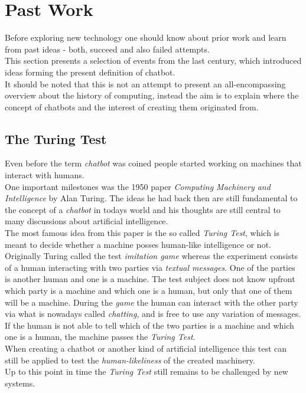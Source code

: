 \section{Past Work}


Before exploring new technology one should know about prior work and learn from past ideas - both, succeed and also failed attempts.
\\
This section presents a selection of events from the last century, which introduced ideas forming the present definition of chatbot.
\\
It should be noted that this is not an attempt to present an all-encompassing overview about the history of computing,
instead the aim is to explain where the concept of chatbots and the interest of creating them originated from.


\subsection{The Turing Test}

Even before the term \emph{chatbot} was coined people started working on machines that interact with humans.
\\
One important milestones was the 1950 paper \emph{Computing Machinery and Intelligence} by Alan Turing\cite{turing}.
The ideas he had back then are still fundamental to the concept of a \emph{chatbot} in todays world
and his thoughts are still central to many discussions about artificial intelligence.
\\
The most famous idea from this paper is the so called \emph{Turing Test},
which is meant to decide whether a machine posses human-like intelligence or not.
\\
Originally Turing called the test \emph{imitation game} whereas the experiment consists of a human interacting with two parties via \emph{textual messages}.
One of the parties is another human and one is a machine.
The test subject does not know upfront which party is a machine and which one is a human, but only that one of them will be a machine.
During the \emph{game} the human can interact with the other party
via what is nowadays called \emph{chatting},
and is free to use any variation of messages.
\\
If the human is not able to tell which of the two parties is a machine and which one is a human, the machine passes the \emph{Turing Test}.
\\

When creating a chatbot or another kind of artificial intelligence this test can still be applied to test the \emph{human-likeliness} of the created machinery.
\\
Up to this point in time the \emph{Turing Test} still remains to be challenged by new systems.


